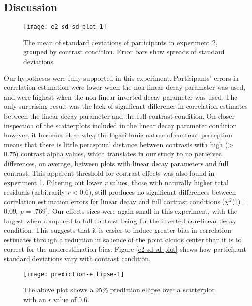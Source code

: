 \documentclass[preprint, 3p,
authoryear]{elsarticle} %
\begin{document}
\hypertarget{discussion-1}{%
\subsection{Discussion}\label{discussion-1}}

\begin{figure}

\texttt{[image: e2-sd-sd-plot-1]} \hfill{}

\caption{\label{e2-sd-sd-plot}The mean of standard deviations of participants in experiment 2, grouped by contrast condition. Error bars show spreads of standard deviations}\label{fig:e2-sd-sd-plot}
\end{figure}

Our hypotheses were fully supported in this experiment. Participants'
errors in correlation estimation were lower when the non-linear decay
parameter was used, and were highest when the non-linear inverted decay
parameter was used. The only surprising result was the lack of
significant difference in correlation estimates between the linear decay
parameter and the full-contrast condition. On closer inspection of the
scatterplots included in the linear decay parameter condition however,
it becomes clear why; the logarithmic nature of contrast perception
\citep{varshney_2013, fechner_1948} means that there is little
perceptual distance between contrasts with high (\textgreater{} 0.75)
contrast alpha values, which translates in our study to no perceived
differences, on average, between plots with linear decay parameters and
full contrast. This apparent threshold for contrast effects was also
found in experiment 1. Filtering out lower \emph{r} values, those with
naturally higher total residuals (arbitrarily \emph{r} \textless{} 0.6),
still produces no significant differences between correlation estimation
errors for linear decay and full contrast conditions (\(\chi^2\)(1) =
0.09, \emph{p} = .769). Our effects sizes were again small in this
experiment, with the largest when compared to full contrast being for
the inverted non-linear decay condition. This suggests that it is easier
to induce greater bias in correlation estimates through a reduction in
salience of the point clouds center than it is to correct for the
underestimation bias. Figure \ref{e2-sd-sd-plot} shows how participant
standard deviations vary with contrast condition.

\begin{figure}

\texttt{[image: prediction-ellipse-1]} \hfill{}

\caption{\label{prediction-ellipse}The above plot shows a 95\% prediction ellipse over a scatterplot with an \textit{r} value of 0.6.}\label{fig:prediction-ellipse}
\end{figure}
\end{document}
